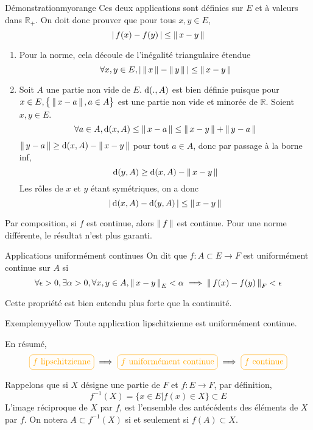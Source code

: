     \begin{demo}{Démonstration}{myorange}
        Ces deux applications sont définies sur $E$ et à valeurs dans $\mathbb{R}_+$. On doit donc prouver que pour tous $x,y \in E$, 
        \[ \left\lvert \,f(x)-f(y) \, \right\rvert \leq \left\lVert \,x-y \, \right\rVert \] 
        \begin{enumerate}
            \item Pour la norme, cela découle de l’inégalité triangulaire étendue 
        \[ \forall x,y \in E, \left\lvert \,\left\lVert \,x \, \right\rVert - \left\lVert \,y \, \right\rVert \, \right\rvert \leq \left\lVert \,x-y \, \right\rVert \]
            \item Soit $A$ une partie non vide de $E$. $\operatorname{d}(.,A)$ est bien définie puisque pour $x \in E, \big\{ \left\lVert \,x-a \, \right\rVert, a \in A \big\}$ est une partie non vide et minorée de $\mathbb{R}$. Soient $x,y \in E$.
            \[ \forall a \in A, \operatorname{d}(x,A) \leq \left\lVert \,x-a \, \right\rVert \leq \left\lVert \,x-y \, \right\rVert + \left\lVert \,y-a \, \right\rVert \] 
            $\left\lVert \,y-a \, \right\rVert \geq \operatorname{d}(x,A) - \left\lVert \,x-y \, \right\rVert$ pour tout $a \in A$, donc par passage à la borne inf, 
            \[ \operatorname{d}(y,A) \geq \operatorname{d}(x,A) - \left\lVert \,x-y \, \right\rVert \] 
            Les rôles de $x$ et $y$ étant symétriques, on a donc 
            \[ \left\lvert \,\operatorname{d}(x,A) - \operatorname{d}(y,A) \, \right\rvert \leq \left\lVert \,x-y \, \right\rVert \] 
        \end{enumerate}

        Par composition, si $f$ est continue, alors $\left\lVert \,f \, \right\rVert$ est continue. Pour une norme différente, le résultat n’est plus garanti.
    \end{demo}

    \begin{defi}{Applications uniformément continues}{}
        On dit que $f : A \subset E \rightarrow F$ est uniformément continue sur $A$ si 
        \[ \forall \epsilon > 0, \exists \alpha > 0, \forall x,y \in A, \left\lVert \,x-y \, \right\rVert_E < \alpha \implies \left\lVert \,f(x)-f(y) \, \right\rVert_F < \epsilon \]
    \end{defi}

    Cette propriété est bien entendu plus forte que la continuité.

    \begin{omed}{Exemple}{myyellow}
        Toute application lipschitzienne est uniformément continue.
    \end{omed}

    En résumé, 
    \[ \lilbox{myyellow}{$f$ lipschitzienne} \implies \lilbox{myyellow}{$f$ uniformément continue} \implies \lilbox{myyellow}{$f$ continue} \]

    Rappelons que si $X$ désigne une partie de $F$ et $f : E \rightarrow F$, par définition,
    \[ f^{-1}(X) = \big\{ x \in E \big| f(x) \in X \big\} \subset E \]
    L’image réciproque de $X$ par $f$, est l’ensemble des antécédents des éléments de $X$ par $f$. On notera $A \subset f^{-1}(X)$ si et seulement si $f(A) \subset X$.

